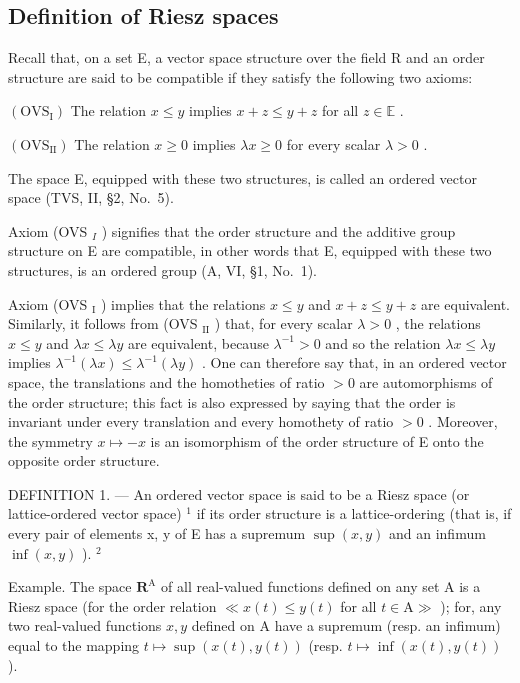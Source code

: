 \subsection{Definition of Riesz spaces}

Recall that, on a set E, a vector space structure over the field R and an order structure are said to be compatible if they satisfy the following two axioms:

\((\mathrm{OVS}_{\mathrm{I}})\) The relation \(x \leqslant y\) implies \(x + z \leqslant y + z\) for all \(z \in \mathbb{E}\) .

\((\mathrm{OVS}_{\mathrm{II}})\) The relation \(x \geqslant 0\) implies \(\lambda x \geqslant 0\) for every scalar \(\lambda > 0\) .

The space E, equipped with these two structures, is called an ordered vector space (TVS, II, §2, No.~5).

Axiom (OVS \(_{I}\) ) signifies that the order structure and the additive group structure on E are compatible, in other words that E, equipped with these two structures, is an ordered group (A, VI, §1, No.~1).

Axiom (OVS \(_{\text{I}}\) ) implies that the relations \(x \leqslant y\) and \(x + z \leqslant y + z\) are equivalent. Similarly, it follows from (OVS \(_{\text{II}}\) ) that, for every scalar \(\lambda > 0\) , the relations \(x \leqslant y\) and \(\lambda x \leqslant \lambda y\) are equivalent, because \(\lambda^{-1} > 0\) and so the relation \(\lambda x \leqslant \lambda y\) implies \(\lambda^{-1}(\lambda x) \leqslant \lambda^{-1}(\lambda y)\) . One can therefore say that, in an ordered vector space, the translations and the homotheties of ratio \(> 0\) are automorphisms of the order structure; this fact is also expressed by saying that the order is invariant under every translation and every homothety of ratio \(> 0\) . Moreover, the symmetry \(x \mapsto -x\) is an isomorphism of the order structure of E onto the opposite order structure.

DEFINITION 1. --- An ordered vector space is said to be a Riesz space (or lattice-ordered vector space) \(^{1}\) if its order structure is a lattice-ordering (that is, if every pair of elements x, y of E has a supremum \(\sup(x,y)\) and an infimum \(\inf(x,y)\) ). \(^{2}\)

Example. The space \(\mathbf{R}^{\mathrm{A}}\) of all real-valued functions defined on any set A is a Riesz space (for the order relation \(\ll x(t) \leqslant y(t)\) for all \(t \in \mathrm{A} \gg\) ); for, any two real-valued functions \(x, y\) defined on A have a supremum (resp. an infimum) equal to the mapping \(t \mapsto \sup(x(t), y(t))\) (resp. \(t \mapsto \inf(x(t), y(t))\) ).

